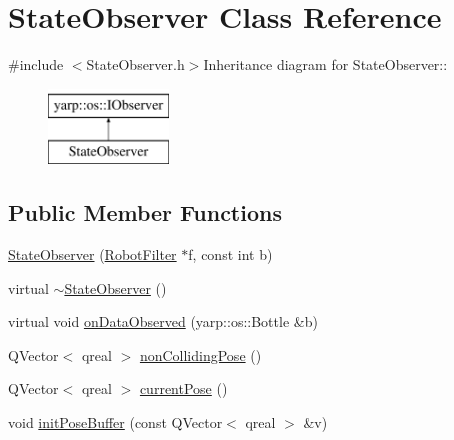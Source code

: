 \hypertarget{class_state_observer}{
\section{StateObserver Class Reference}
\label{class_state_observer}
}


{\ttfamily \#include $<$StateObserver.h$>$}Inheritance diagram for StateObserver::\begin{figure}[H]
\begin{center}
\leavevmode
\includegraphics[height=2cm]{class_state_observer}
\end{center}
\end{figure}
\subsection*{Public Member Functions}
\begin{DoxyCompactItemize}
\item 
\hyperlink{class_state_observer_a2c4bfeb55e24f75987cadadc3f89ecca}{StateObserver} (\hyperlink{class_robot_filter}{RobotFilter} $\ast$f, const int b)
\item 
virtual \hyperlink{class_state_observer_af4bf0f323eff464401227a01db686edb}{$\sim$StateObserver} ()
\item 
virtual void \hyperlink{class_state_observer_af104fa553abf31754d9acc084e9aa31f}{onDataObserved} (yarp::os::Bottle \&b)
\item 
QVector$<$ qreal $>$ \hyperlink{class_state_observer_ac77f03f2f6c059e03cb1d5553a4e645d}{nonCollidingPose} ()
\item 
QVector$<$ qreal $>$ \hyperlink{class_state_observer_afe5862adf3afcea5598258625c5db003}{currentPose} ()
\item 
void \hyperlink{class_state_observer_ab41baf5be5f7486796adbbdc0014985b}{initPoseBuffer} (const QVector$<$ qreal $>$ \&v)
\end{DoxyCompactItemize}



